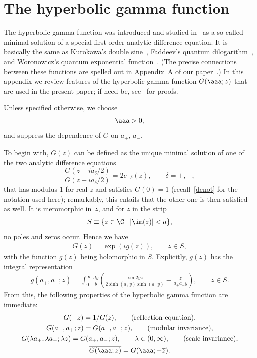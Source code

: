 \documentclass[pdftex]{sigma}
\numberwithin{equation}{section}
\begin{document}
\section{The hyperbolic gamma function}\label{appendixA}

The  hyperbolic gamma function was introduced and studied in~\cite{fo} as a so-called minimal solution of a special f\/irst order analytic dif\/ference equation. It is basically the same as Kurokawa's double sine~\cite{kuro}, Faddeev's quantum dilogarithm~\cite{fadd2}, and Woronowicz's quantum exponential function~\cite{woro}. (The precise connections between these functions are spelled out in Appendix~A of our paper~\cite{Hels}.) In this appendix we review features of the hyperbolic gamma function $G(\aaa;z)$ that are used in the present paper; if need be, see~\cite{fo} for proofs.

Unless specif\/ied otherwise, we choose
\begin{gather}
\aaa >0,
\end{gather}
and suppress the dependence of $G$ on $a_+$, $a_-$.

 To begin with, $G(z)$ can be def\/ined as the unique minimal solution of one of the two analytic dif\/ference equations
\begin{equation}\label{Gades}
	\frac{G(z+ia_\delta/2)}{G(z-ia_\delta/2)} = 2c_{-\delta}(z),\qquad  \delta=+,-,
\end{equation}
that has modulus 1 for real $z$ and satisf\/ies $G(0)=1$ (recall~\eqref{denot} for the notation used here); remarkably, this entails that the other one is then satisf\/ied as well.
It is meromorphic in~$z$,
and for $z$ in the strip
\begin{gather}\label{strip}
S\equiv \{z\in\C \mid |\im (z)|<a\},
\end{gather}
no poles and zeros occur. Hence we have
\begin{gather}\label{Gg}
G(z)=\exp(ig(z)),\qquad z\in S,
\end{gather}
with the function $g(z)$ being holomorphic in $S$.
 Explicitly, $g(z)$ has the integral representation
\begin{gather}\label{ghyp}
g(a_{+},a_{-};z) =\int_0^\infty\frac{dy}{y}\left(\frac{\sin 2yz}{2\sinh(a_{+}y)\sinh(a_{-}y)} - \frac{z}{a_{+}a_{-} y}\right),\qquad z\in S.
\end{gather}
From this, the following properties of the hyperbolic gamma function are immediate:
\begin{gather}\label{refl}	
G(-z) = 1/G(z),\qquad ({\rm ref\/lection\ equation}),
\\
\label{modinv}
G(a_-,a_+;z) = G(a_+,a_-;z),\qquad  ({\rm modular\ invariance}),
\\
\label{sc}
	G(\lambda a_+,\lambda a_-;\lambda z) = G(a_+,a_-;z),\qquad \lambda\in(0,\infty),\qquad ({\rm scale\ invariance}),
\\
\label{Gcon}
\overline{G(\aaa;z)}=G(\aaa;-\overline{z}).
\end{gather}
\end{document}
